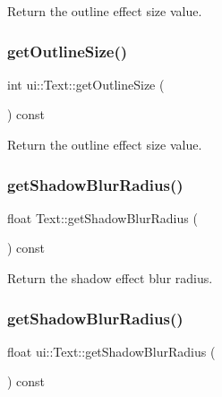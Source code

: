 Return the outline effect size value. \mbox{\label{classui_1_1Text_aa66f027d1a211fc1ee6cba3650ed8166}} 
\subsubsection{\texorpdfstring{get\+Outline\+Size()}{getOutlineSize()}\hspace{0.1cm}{\footnotesize\ttfamily [2/2]}}
{\footnotesize\ttfamily int ui\+::\+Text\+::get\+Outline\+Size (\begin{DoxyParamCaption}{ }\end{DoxyParamCaption}) const}

Return the outline effect size value. \mbox{\label{classui_1_1Text_a301af594fb5f9f5b5b75fe7319f7fb3e}} 
\subsubsection{\texorpdfstring{get\+Shadow\+Blur\+Radius()}{getShadowBlurRadius()}\hspace{0.1cm}{\footnotesize\ttfamily [1/2]}}
{\footnotesize\ttfamily float Text\+::get\+Shadow\+Blur\+Radius (\begin{DoxyParamCaption}{ }\end{DoxyParamCaption}) const}

Return the shadow effect blur radius. \mbox{\label{classui_1_1Text_af78e7c5927071915480df8d780a2c071}} 
\subsubsection{\texorpdfstring{get\+Shadow\+Blur\+Radius()}{getShadowBlurRadius()}\hspace{0.1cm}{\footnotesize\ttfamily [2/2]}}
{\footnotesize\ttfamily float ui\+::\+Text\+::get\+Shadow\+Blur\+Radius (\begin{DoxyParamCaption}{ }\end{DoxyParamCaption}) const}

